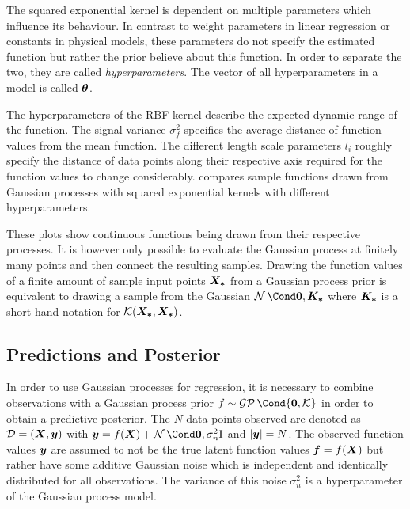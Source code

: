 The squared exponential kernel is dependent on multiple parameters which influence its behaviour.
In contrast to weight parameters in linear regression or constants in physical models, these parameters do not specify the estimated function but rather the prior believe about this function.
In order to separate the two, they are called \emph{hyperparameters}.
The vector of all hyperparameters in a model is called $\bm{\theta}$.

The hyperparameters of the RBF kernel describe the expected dynamic range of the function.
The signal variance $\sigma_f^2$ specifies the average distance of function values from the mean function.
The different length scale parameters $l_i$ roughly specify the distance of data points along their respective axis required for the function values to change considerably.
 compares sample functions drawn from Gaussian processes with squared exponential kernels with different hyperparameters.

These plots show continuous functions being drawn from their respective processes.
It is however only possible to evaluate the Gaussian process at finitely many points and then connect the resulting samples.
Drawing the function values of a finite amount of sample input points $\bm{X_\ast}$ from a Gaussian process prior is equivalent to drawing a sample from the Gaussian $\Gaussian{\mat{0}, \mat{K_\ast}}$ where $\bm{K_\ast}$ is a short hand notation for $\operatorname{\mathcal{K}}(\bm{X_\ast}, \bm{X_\ast})$.

\subsection{Predictions and Posterior}
In order to use Gaussian processes for regression, it is necessary to combine observations with a Gaussian process prior $f \sim \GP\Cond{\mat{0}, \K}$ in order to obtain a predictive posterior.
The $N$ data points observed are denoted as $\mathcal{D} = \left( \bm{X}, \bm{y} \right)$ with $\mat{y} = f(\mat{X}) + \Gaussian{\mat{0}, \sigma_n^2 \Eye}$ and $\vert\bm{y}\vert = N$.
The observed function values $\bm{y}$ are assumed to not be the true latent function values $\bm{f} = f(\bm{X})$ but rather have some additive Gaussian noise which is independent and identically distributed for all observations.
The variance of this noise $\sigma_n^2$ is a hyperparameter of the Gaussian process model.

